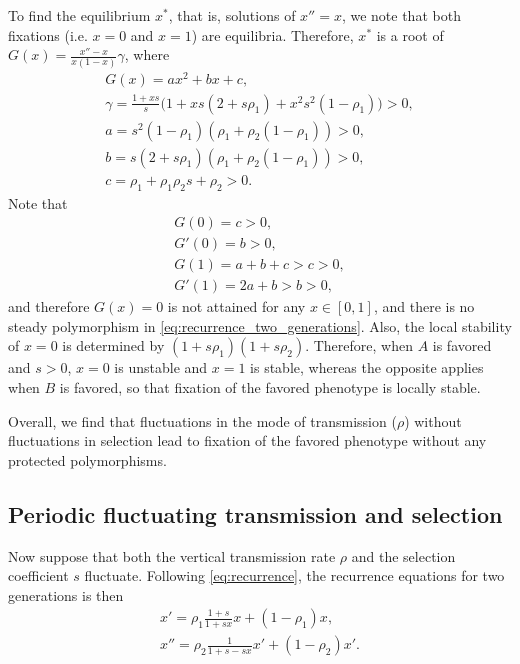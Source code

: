 \documentclass[12pt]{extarticle} %
\begin{document}
To find the equilibrium $x^*$, that is, solutions of $x''=x$, we note that both fixations (i.e. $x=0$ and $x=1$) are equilibria. 
Therefore, $x^*$ is a root of $G(x) = \frac{x''-x}{x(1-x)} \gamma$, where
\begin{align}
G(x) = ax^2+bx+c, \\
\gamma = \frac{1+xs}{s} \Big( 1 + xs(2+s\rho_1) + x^2 s^2 (1-\rho_1) \Big) > 0, \\
a = s^2 (1-\rho_1) (\rho_1 + \rho_2(1-\rho_1)) > 0, \\
b = s(2+s\rho_1)(\rho_1 + \rho_2(1-\rho_1)) > 0, \\
c = \rho_1 + \rho_1 \rho_2 s + \rho_2 > 0.
\end{align} 
Note that 
\begin{align}
G(0) = c > 0,\\ 
G'(0) = b > 0,\\
G(1)=a+b+c>c>0,\\
G'(1)=2a+b>b>0,
\end{align}
and therefore $G(x)=0$ is not attained for any $x \in [0,1]$, and there is no steady polymorphism in \eqref{eq:recurrence_two_generations}.
Also, the local stability of $x=0$ is determined by $(1+s\rho_1)(1+s\rho_2)$.
Therefore, when $A$ is favored and $s>0$, $x=0$ is unstable and $x=1$ is stable, whereas the opposite applies when $B$ is favored, so that fixation of the favored phenotype is locally stable.

Overall, we find that fluctuations in the mode of transmission ($\rho$) without fluctuations in selection lead to fixation of the favored phenotype without any protected polymorphisms.

\subsection*{Periodic fluctuating transmission and selection}

Now suppose that both the vertical transmission rate $\rho$ and the selection coefficient $s$ fluctuate.
Following \eqref{eq:recurrence}, the recurrence equations for two generations is then
\begin{equation}\begin{aligned} \label{eq:recurrence_two_generations_fluc_s}
x' = \rho_1 \frac{1+s}{1+sx} x + (1-\rho_1)x, \\
x'' = \rho_2 \frac{1}{1+s-sx} x' + (1-\rho_2)x'.
\end{aligned}\end{equation}
\end{document}
